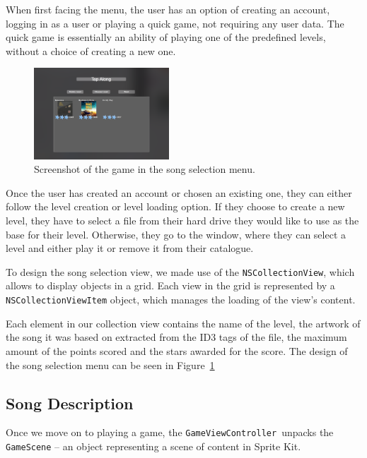When first facing the menu, the user has an option of creating an account, logging in as a user or playing a quick game, not requiring any user data. 
The quick game is essentially an ability of playing one of the predefined levels, without a choice of creating a new one.

\begin{figure}
  \begin{center}
    \includegraphics[width=0.45\textwidth]{Figures/CollectionView}
  \end{center}
  \caption{Screenshot of the game in the song selection menu.}
\label{fig:songselection}
\end{figure}


Once the user has created an account or chosen an existing one, they can either follow the level creation or level loading option. If they choose to create a new level, they have to select a file from their hard drive they would like to use as the base for their level. Otherwise, they go to the window, where they can select a level and either play it or remove it from their catalogue.

To design the song selection view, we made use of the \verb|NSCollectionView|, which allows to display objects in a grid. Each view in the grid is represented by a \verb|NSCollectionViewItem| object, which manages the loading of the view's content.

Each element in our collection view contains the name of the level, the artwork of the song it was based on extracted from the ID3 tags of the file, the maximum amount of the points scored and the stars awarded for the score. The design of the song selection menu can be seen in Figure~\ref{fig:songselection}

\vspace{10pt}

\subsection{Song Description}

Once we move on to playing a game, the \verb|GameViewController|~unpacks the \verb|GameScene| -- an object representing a scene of content in Sprite Kit.


